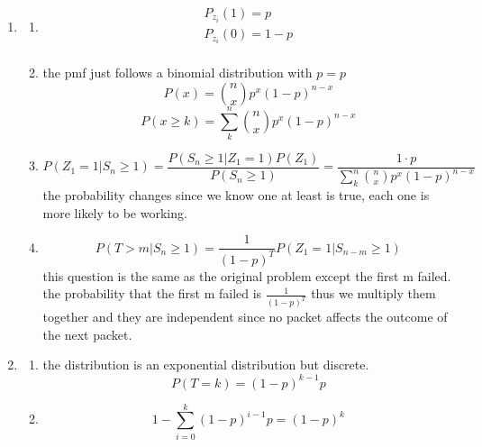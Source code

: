 \documentclass{article}
\begin{document}
\begin{enumerate}
    \item \begin{enumerate}
        \item \begin{equation}
            \begin{split}
                P_{z_i}(1) = p\\
                P_{z_i}(0) = 1-p\\
            \end{split}
        \end{equation}
        \item the pmf just follows a binomial distribution with \(p=p\)
        \begin{equation}
            P(x)  = {n\choose x} p^x (1-p)^{n-x}
        \end{equation}
        \begin{equation}
            P(x\geq k) = \sum_{k}^{n} {n\choose x} p^x (1-p)^{n-x}
        \end{equation}
        \item \begin{equation}
            P(Z_1 = 1|S_n\geq 1) =\frac{P(S_n\geq 1| Z_1 = 1) P(Z_1)}{P(S_n\geq 1)} = \frac{1 \cdot p}{\sum_{k}^{n} {n\choose x} p^x (1-p)^{n-x}}
        \end{equation}
        the probability changes since we know one at least is true, each one is more likely to be working.
        \item \begin{equation}
            P(T > m | S_n \geq 1) = \frac{1}{(1-p)^T}P(Z_1 = 1|S_{n-m}\geq 1)
        \end{equation}
        this question is the same as the original problem except the first m failed. the probability that the first m failed is \(\frac{1}{(1-p)^T}\) thus we multiply them together and they are independent since no packet affects the outcome of the next packet.
    \end{enumerate}
    \item \begin{enumerate}
        \item the distribution is an exponential distribution but discrete. 
        \begin{equation}
            P(T=k) = (1-p)^{k-1}p
        \end{equation}
        \item \begin{equation}
            1- \sum_{i=0}^k  (1-p)^{i-1}p = (1-p)^k
        \end{equation}

\end{enumerate}
\end{enumerate}
\end{document}
